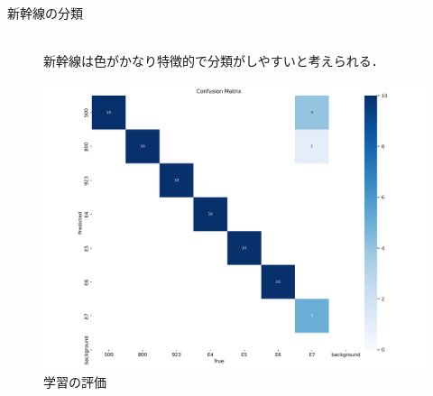 \begin{minipage}[]{0.4\textwidth}\vspace{0pt}
	\begin{description}
	
		
	    \item [新幹線の分類]~\\
		新幹線は色がかなり特徴的で分類がしやすいと考えられる．
		
	\end{description}
\end{minipage}
	\hfill
\begin{minipage}[]{0.6\textwidth}\vspace{0pt}
	\begin{figure}
		\centering
		\includegraphics[width=0.75\linewidth]{fig/confusion_matrix}
		\caption{学習の評価}
		\label{fig:confusionmatrix}
	\end{figure}
\end{minipage}
\newpage



